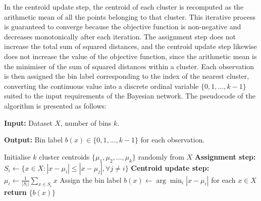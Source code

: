 In the centroid update step, the centroid of each cluster is recomputed as the arithmetic mean of all the points belonging to that cluster. This iterative process is guaranteed to converge because the objective function is non-negative and decreases monotonically after each iteration. The assignment step does not increase the total sum of squared distances, and the centroid update step likewise does not increase the value of the objective function, since the arithmetic mean is the minimiser of the sum of squared distances within a cluster. Each observation is then assigned the bin label corresponding to the index of the nearest cluster, converting the continuous value into a discrete ordinal variable $\{0, 1, \dots, k-1\}$ suited to the input requirements of the Bayesian network. The pseudocode of the algorithm is presented as follows:

\vspace{0.5em}
\begin{algorithm}[H]
\caption{Pseudocode of the K-means algorithm for discretisation}
\label{alg:kmeans_discretization}

\vspace{0.5em}
\textbf{Input:} Dataset $X$, number of bins $k$.

\vspace{0.5cm}

\textbf{Output:} Bin label $b(x) \in \{0, 1, \dots, k-1\}$ for each observation.

\begin{tcolorbox}
\begin{algorithmic}[1]
    \State Initialise $k$ cluster centroids $\{\mu_1, \mu_2, \dots, \mu_k\}$ randomly from $X$
    \Repeat
        \State \textbf{Assignment step:} $S_i \gets \{x \in X : |x - \mu_i| \leq |x - \mu_j|, \forall j \neq i\}$
        \State \textbf{Centroid update step:} $\mu_i \gets \frac{1}{|S_i|} \sum_{x \in S_i} x$
    \State Assign the bin label $b(x) \gets \arg\min_i |x - \mu_i|$ for each $x \in X$
    \State \textbf{return} $\{b(x)\}$
\end{algorithmic}
\end{tcolorbox}

\end{algorithm}

